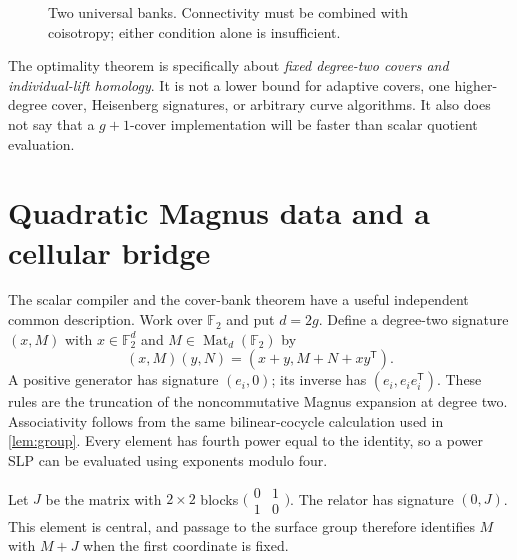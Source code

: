 \documentclass[11pt,letterpaper]{article}
\theoremstyle{definition}
\theoremstyle{remark}
\newcommand{\F}{\mathbb F_2}
\begin{document}
\begin{figure}[ht]
\centering
{}
\caption{Two universal banks. Connectivity must be combined with coisotropy; either condition alone is insufficient.}
\label{fig:banks}
\end{figure}

The optimality theorem is specifically about \emph{fixed degree-two covers and individual-lift homology}. It is not a lower bound for adaptive covers, one higher-degree cover, Heisenberg signatures, or arbitrary curve algorithms. It also does not say that a $g+1$-cover implementation will be faster than scalar quotient evaluation.

\section{Quadratic Magnus data and a cellular bridge}
\label{sec:magnus}
The scalar compiler and the cover-bank theorem have a useful independent common description. Work over $\F$ and put $d=2g$. Define a degree-two signature $(x,M)$ with $x\in\F^d$ and $M\in\operatorname{Mat}_d(\F)$ by
\begin{equation}\label{eq:magnus}
 (x,M)(y,N)=(x+y,M+N+xy^{\mathsf T}).
\end{equation}
A positive generator has signature $(e_i,0)$; its inverse has $(e_i,e_ie_i^{\mathsf T})$. These rules are the truncation of the noncommutative Magnus expansion at degree two. Associativity follows from the same bilinear-cocycle calculation used in \cref{lem:group}. Every element has fourth power equal to the identity, so a power SLP can be evaluated using exponents modulo four.

Let $J$ be the matrix with $2\times2$ blocks $\bigl(\begin{smallmatrix}0&1\\1&0\end{smallmatrix}\bigr)$. The relator has signature $(0,J)$. This element is central, and passage to the surface group therefore identifies $M$ with $M+J$ when the first coordinate is fixed.
\end{document}
